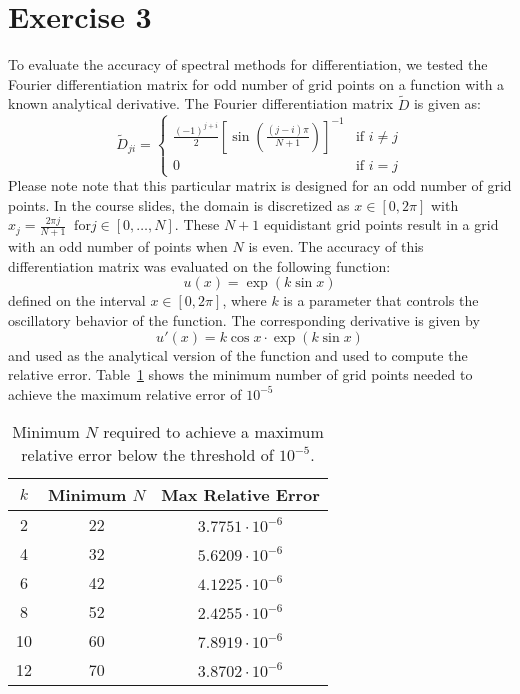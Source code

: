 \section*{Exercise 3}
To evaluate the accuracy of spectral methods for differentiation, we tested the Fourier differentiation matrix for odd number of grid points on a function with a known analytical derivative. The Fourier differentiation matrix $\tilde{D}$ is given as:
\begin{equation}
	\tilde{D}_{ji} = \begin{cases}
		\frac{(-1)^{j+i}}{2}\left[\sin\left(\frac{(j-i)\pi}{N+1}\right)\right]^{-1} & \text{if } i \neq j \\
		0                                                                           & \text{if } i = j
	\end{cases}
\end{equation}
Please note note that this particular matrix is designed for an odd number of grid points. In the course slides, the domain is discretized as $x \in [0, 2\pi]$ with $x_j = \frac{2 \pi j}{N+1} \  \text{ for} j\in[0, \dots, N]$. These $N+1$ equidistant grid points result in a grid with an odd number of points when $N$ is even.\newline
\newline
The accuracy of this differentiation matrix was evaluated on the following function:
\begin{equation}
	u(x) = \exp(k\sin x)
\end{equation}
defined on the interval $x \in [0, 2\pi]$, where $k$ is a parameter that controls the oscillatory behavior of the function. The corresponding derivative is given by
\begin{equation}
	u'(x) = k\cos x \cdot \exp(k\sin x)
\end{equation}
and used as the analytical version of the function and used to compute the relative error.
Table~\ref{tab:fourier_accuracy} shows the minimum number of grid points needed to achieve the maximum relative error of $10^{-5}$
\begin{table}[H]
	\centering
	\begin{tabular}{|c|c|c|}
		\hline
		$k$ & Minimum $N$ & Max Relative Error     \\
		\hline
		2   & 22          & $3.7751 \cdot 10^{-6}$ \\
		4   & 32          & $5.6209 \cdot 10^{-6}$ \\
		6   & 42          & $4.1225 \cdot 10^{-6}$ \\
		8   & 52          & $2.4255 \cdot 10^{-6}$ \\
		10  & 60          & $7.8919 \cdot 10^{-6}$ \\
		12  & 70          & $3.8702 \cdot 10^{-6}$ \\
		\hline
	\end{tabular}
	\caption{Minimum $N$ required to achieve a maximum relative error below the threshold of $10^{-5}$.}
	\label{tab:fourier_accuracy}
\end{table}
